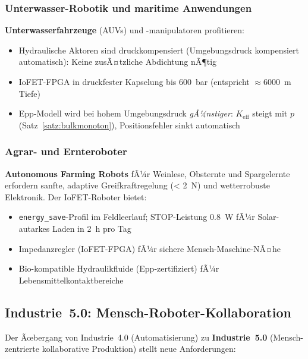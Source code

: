 ﻿\documentclass[a4paper,12pt]{scrreprt}
\theoremstyle{definition}
\begin{document}
\subsubsection{Unterwasser-Robotik und maritime Anwendungen}

\textbf{Unterwasserfahrzeuge} (AUVs) und -manipulatoren profitieren:
\begin{itemize}
  \item Hydraulische Aktoren sind druckkompensiert (Umgebungsdruck
        kompensiert automatisch): Keine zusÃ¤tzliche Abdichtung nÃ¶tig
  \item IoFET-FPGA in druckfester Kapselung bis \SI{600}{\bar}
        (entspricht $\approx$\SI{6000}{\meter} Tiefe)
  \item Epp-Modell wird bei hohem Umgebungsdruck \emph{gÃ¼nstiger}:
        $K_{\text{eff}}$ steigt mit $p$ (Satz~\ref{satz:bulkmonoton}),
        Positionsfehler sinkt automatisch
\end{itemize}

\subsubsection{Agrar- und Ernteroboter}

\textbf{Autonomous Farming Robots} fÃ¼r Weinlese, Obsternte und
Spargelernte erfordern sanfte, adaptive Greifkraftregelung
(\SI{< 2}{\newton}) und wetterrobuste Elektronik.
Der IoFET-Roboter bietet:
\begin{itemize}
  \item \texttt{energy\_save}-Profil im Feldleerlauf; STOP-Leistung \SI{0.8}{\watt}
        fÃ¼r Solar-autarkes Laden in 2~h pro Tag
  \item Impedanzregler (IoFET-FPGA) fÃ¼r sichere Mensch-Maschine-NÃ¤he
  \item Bio-kompatible Hydraulikfluide (Epp-zertifiziert) fÃ¼r
        Lebensmittelkontaktbereiche
\end{itemize}

\subsection{Industrie~5.0: Mensch-Roboter-Kollaboration}

Der Ãœbergang von Industrie~4.0 (Automatisierung) zu \textbf{Industrie~5.0}
(Mensch-zentrierte kollaborative Produktion) stellt neue Anforderungen:
\end{document}

